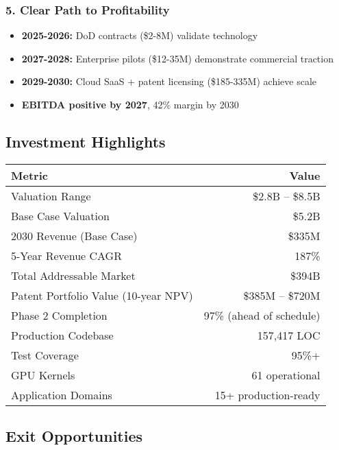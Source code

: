 \documentclass[11pt,letterpaper]{article}
\begin{document}
\subsubsection{5. Clear Path to Profitability}

\begin{itemize}
    \item \textbf{2025-2026:} DoD contracts (\$2-8M) validate technology
    \item \textbf{2027-2028:} Enterprise pilots (\$12-35M) demonstrate commercial traction
    \item \textbf{2029-2030:} Cloud SaaS + patent licensing (\$185-335M) achieve scale
    \item \textbf{EBITDA positive by 2027}, 42\% margin by 2030
\end{itemize}

\subsection{Investment Highlights}

\begin{tcolorbox}[colback=lightgray,colframe=primaryblue,title=Key Investment Metrics]
\begin{table}[H]
\centering
\begin{tabularx}{0.95\textwidth}{Xr}
\toprule
\textbf{Metric} & \textbf{Value} \\
\midrule
Valuation Range & \$2.8B -- \$8.5B \\
Base Case Valuation & \$5.2B \\
2030 Revenue (Base Case) & \$335M \\
5-Year Revenue CAGR & 187\% \\
Total Addressable Market & \$394B \\
Patent Portfolio Value (10-year NPV) & \$385M -- \$720M \\
Phase 2 Completion & 97\% (ahead of schedule) \\
Production Codebase & 157,417 LOC \\
Test Coverage & 95\%+ \\
GPU Kernels & 61 operational \\
Application Domains & 15+ production-ready \\
\bottomrule
\end{tabularx}
\end{table}
\end{tcolorbox}

\subsection{Exit Opportunities}
\end{document}

